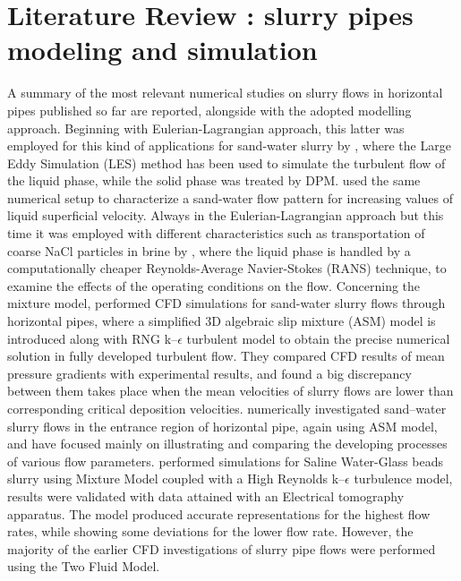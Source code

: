 \documentclass[11pt]{report}
\begin{document}
\chapter{Literature Review : slurry pipes modeling and simulation}
%
A summary of the most relevant numerical studies on slurry flows in horizontal pipes published so far are reported, alongside with the adopted modelling approach.
%
Beginning with Eulerian-Lagrangian approach, this latter was employed for this kind of applications for sand-water slurry by \citet{Capecelatro-2013}, where the Large Eddy Simulation (LES) method \citet{versteeg2007introduction} has been used to simulate the turbulent flow of the liquid phase, while the solid phase was treated by DPM.
%
\citet{AROLLA20151} used the same numerical setup to characterize a sand-water flow pattern for increasing values of liquid superficial velocity.
%
Always in the Eulerian-Lagrangian approach but this time it was employed with different characteristics such as transportation of coarse NaCl particles in brine by \citet{Uzi-2017}, where the liquid phase is handled by a computationally cheaper Reynolds-Average Navier-Stokes (RANS) technique, to examine the effects of the operating conditions on the flow.
%
Concerning the mixture model, \citet{J-2003} performed CFD simulations for sand-water slurry flows through horizontal pipes, where a simplified 3D algebraic slip mixture (ASM) model is introduced along with RNG k–$\epsilon$ turbulent model to obtain the precise numerical solution in fully developed turbulent flow.
%
They compared CFD results of mean pressure gradients with experimental results, and found a big discrepancy between them takes place when the mean velocities of slurry flows are lower than corresponding critical deposition velocities.
%
\citet{C.X-2008} numerically investigated sand–water slurry flows in the entrance region of horizontal pipe, again using ASM model, and have focused mainly on illustrating and comparing the developing processes of various flow parameters.
%
\citet{Silva-2016} performed simulations for Saline Water-Glass beads slurry using Mixture Model coupled with a High Reynolds k–$\epsilon$ turbulence model, results were validated with data attained with an Electrical tomography apparatus.
%
The model produced accurate representations for the highest flow rates, while showing some deviations for the lower flow rate.
%
However, the majority of the earlier CFD investigations of slurry pipe flows were performed using the Two Fluid Model.
\end{document}
